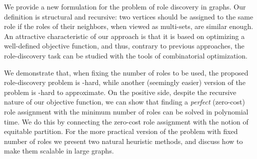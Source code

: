 We provide a new formulation for the 
problem of role discovery in graphs. 
Our definition is structural and recursive: 
two vertices should be assigned to the same role
if the roles of their neighbors, when viewed as multi-sets, are similar enough.
An attractive characteristic of our approach 
is that it is based on optimizing a well-defined objective function, 
and thus, contrary to previous approaches, 
the role-discovery task can be studied with the tools of combinatorial optimization.

We demonstrate that, when fixing the number of roles to be used, 
the proposed role-discovery problem is \np-hard, 
while another (seemingly easier) version of the problem is \np-hard to approximate.
On the positive side, 
despite the recursive nature of our objective function, 
we can show that finding a \emph{perfect} (zero-cost) role assignment
with the minimum number of roles can be solved in polynomial time. 
We do this by connecting the zero-cost role assignment with the notion of equitable partition.
For the more practical version of the problem with fixed number of roles
we present two natural heuristic methods, 
and discuss how to make them scalable in large graphs.
